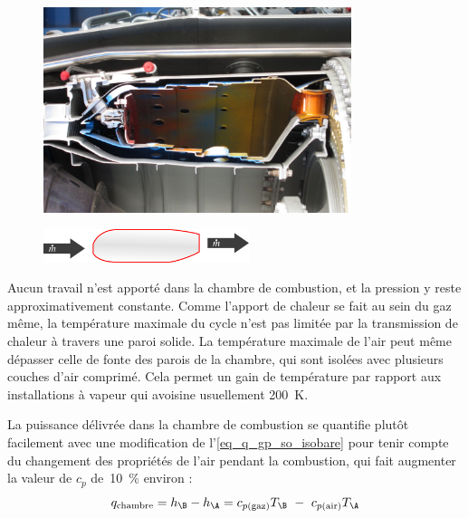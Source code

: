 		\begin{figure}
			\begin{center}
				\includegraphics[width=9cm]{images/photo_chambre_combustion.jpg}
			\end{center}
			\label{fig_chambre_de_combustion1}
		\end{figure}

		\begin{figure}
			\begin{center}
				\includegraphics[width=6cm]{images/symbole_chambre_combustion.png}
			\end{center}
			\label{fig_chambre_de_combustion2}
		\end{figure}

		Aucun travail n’est apporté dans la chambre de combustion, et la pression y reste approximativement constante.	Comme l’apport de chaleur se fait au sein du gaz même, la température maximale du cycle n’est pas limitée par la transmission de chaleur à travers une paroi solide. La température maximale de l’air peut même dépasser celle de fonte des parois de la chambre, qui sont isolées avec plusieurs couches d’air comprimé. Cela permet un gain de température par rapport aux installations à vapeur qui avoisine usuellement \SI{200}{\kelvin}.

		La puissance délivrée dans la chambre de combustion se quantifie plutôt facilement avec une modification de l’\cref{eq_q_gp_so_isobare} pour tenir compte du changement des propriétés de l’air pendant la combustion, qui fait augmenter la valeur de $c_p$ de~\SI{10}{\percent} environ :
		\begin{equation}
			q_\text{chambre} = h_\B - h_\A = c_{p \text{(gaz)}} T_\B \ - \ c_{p \text{(air)}} T_\A
		\end{equation}

